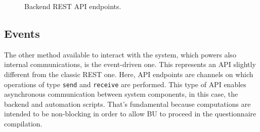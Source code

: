 \documentclass[12pt,a4paper,openright,twoside]{book}
\begin{document}
\begin{figure}
    \centering
    \hfill
    \hfill
    
    \caption{Backend REST \ac{API} endpoints.}
    \label{fig:rest-api}
\end{figure}


\subsection{Events}

The other method available to interact with the system, which powers also internal communications, is the event-driven one.
%
This represents an \ac{API} slightly different from the classic REST one. 
%
Here, \ac{API} endpoints are channels on which operations of type \texttt{send} and \texttt{receive} are performed.
%
This type of \ac{API} enables asynchronous communication between system components, in this case, the backend and automation scripts.
%
That's fundamental because computations are intended to be non-blocking in order to allow \ac{BU} to proceed in the questionnaire compilation.
\end{document}
